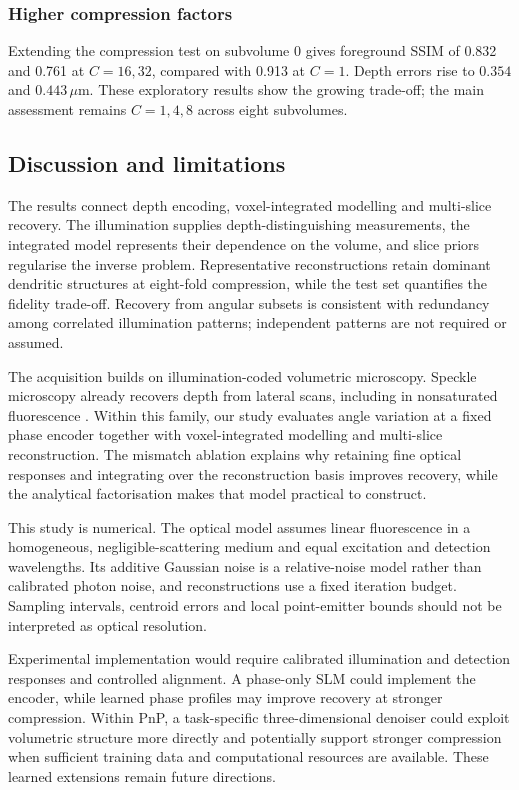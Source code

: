 \subsubsection{Higher compression factors}

Extending the compression test on subvolume 0 gives foreground SSIM of 0.832 and 0.761 at \(C=16,32\), compared with 0.913 at \(C=1\). Depth errors rise to \(0.354\) and \(0.443\,\mu\mathrm m\). These exploratory results show the growing trade-off; the main assessment remains \(C=1,4,8\) across eight subvolumes.

\subsection{Discussion and limitations}

The results connect depth encoding, voxel-integrated modelling and multi-slice recovery. The illumination supplies depth-distinguishing measurements, the integrated model represents their dependence on the volume, and slice priors regularise the inverse problem. Representative reconstructions retain dominant dendritic structures at eight-fold compression, while the test set quantifies the fidelity trade-off. Recovery from angular subsets is consistent with redundancy among correlated illumination patterns; independent patterns are not required or assumed.

The acquisition builds on illumination-coded volumetric microscopy. Speckle microscopy already recovers depth from lateral scans, including in nonsaturated fluorescence \cite{pascucci2019}. Within this family, our study evaluates angle variation at a fixed phase encoder together with voxel-integrated modelling and multi-slice reconstruction. The mismatch ablation explains why retaining fine optical responses and integrating over the reconstruction basis improves recovery, while the analytical factorisation makes that model practical to construct.

This study is numerical. The optical model assumes linear fluorescence in a homogeneous, negligible-scattering medium and equal excitation and detection wavelengths. Its additive Gaussian noise is a relative-noise model rather than calibrated photon noise, and reconstructions use a fixed iteration budget. Sampling intervals, centroid errors and local point-emitter bounds should not be interpreted as optical resolution.

Experimental implementation would require calibrated illumination and detection responses and controlled alignment. A phase-only SLM could implement the encoder, while learned phase profiles may improve recovery at stronger compression. Within PnP, a task-specific three-dimensional denoiser could exploit volumetric structure more directly and potentially support stronger compression when sufficient training data and computational resources are available. These learned extensions remain future directions.
